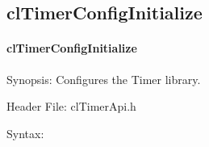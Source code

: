 \begin{flushleft}
\subsection{clTimerConfigInitialize}
\hypertarget{pagetmr101}{}\paragraph{cl\-Timer\-Config\-Initialize}\label{pagetmr101}
\begin{Desc}
\item[Synopsis:]Configures the Timer library.\end{Desc}
\begin{Desc}
\item[Header File:]clTimerApi.h\end{Desc}
\begin{Desc}
\item[Syntax:]


\end{Desc}
\end{flushleft}
